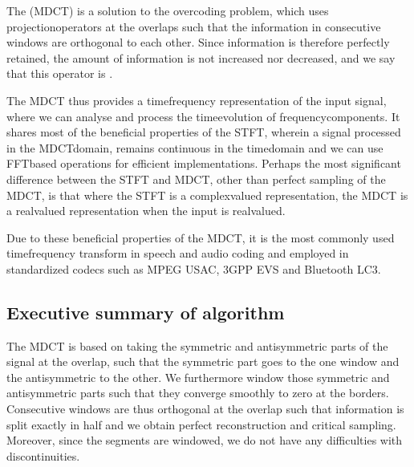 \documentclass[letterpaper,10pt,english]{jupyterBook}
\begin{document}
\sphinxAtStartPar
The  (MDCT) is a solution to the
over\sphinxhyphen{}coding problem, which uses projection\sphinxhyphen{}operators at the overlaps
such that the information in consecutive windows are orthogonal to each
other. Since information is therefore perfectly retained, the amount of
information is not increased nor decreased, and we say that this
operator is .

\sphinxAtStartPar
The MDCT thus provides a time\sphinxhyphen{}frequency representation of the input
signal, where we can analyse and process the time\sphinxhyphen{}evolution of
frequency\sphinxhyphen{}components. It shares most of the beneficial properties of the
STFT, wherein a signal processed in the MDCT\sphinxhyphen{}domain, remains continuous
in the time\sphinxhyphen{}domain and we can use FFT\sphinxhyphen{}based operations for efficient
implementations. Perhaps the most significant difference between the
STFT and MDCT, other than perfect sampling of the MDCT, is that where
the STFT is a complex\sphinxhyphen{}valued representation, the MDCT is a real\sphinxhyphen{}valued
representation when the input is real\sphinxhyphen{}valued.

\sphinxAtStartPar
Due to these beneficial properties of the MDCT, it is the most commonly
used time\sphinxhyphen{}frequency transform in speech and audio coding and employed in
standardized codecs such as MPEG USAC, 3GPP EVS and Bluetooth LC3.

\sphinxAtStartPar
{}


\subsection{Executive summary of algorithm}
\label{\detokenize{Transmission/Modified_discrete_cosine_transform_MDCT:executive-summary-of-algorithm}}
\sphinxAtStartPar
The MDCT is based on taking the symmetric and anti\sphinxhyphen{}symmetric parts of
the signal at the overlap, such that the symmetric part goes to the one
window and the antisymmetric to the other. We furthermore window those
symmetric and antisymmetric parts such that they converge smoothly to
zero at the borders. Consecutive windows are thus orthogonal at the
overlap such that information is split exactly in half and we obtain
perfect reconstruction and critical sampling. Moreover, since the
segments are windowed, we do not have any difficulties with
discontinuities.
\end{document}
